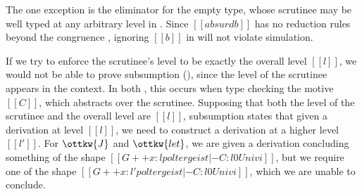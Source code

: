 \documentclass[acmsmall, screen=true, nonacm=true,
  review=\ifpublic false\else true\fi,
  anonymous=\ifanonymous true\else false\fi
]{acmart}
\makeatletter
\newcommand{\name}{\texorpdfstring{DCOI$^{\omega}$\@\xspace}{DCOI-omega}}
\newcommand{\mathcolorbox}[2]{\colorbox{#1}{$#2$}}
\newcommand{\hlcolor}{yellow}
\makeatother
\begin{document}
The one exception is the eliminator for the empty type,
whose scrutinee may be well typed at any arbitrary level in .
Since $[[absurd b]]$ has no reduction rules beyond the congruence ,
ignoring $[[b]]$ in  will not violate simulation.

If we try to enforce the scrutinee's level
to be exactly the overall level $[[l]]$,
we would not be able to prove subsumption (),
since the level of the scrutinee appears in the context.
In both , this occurs when type checking the motive $[[C]]$,
which abstracts over the scrutinee.
Supposing that both the level of the scrutinee and the overall level are $[[l]]$,
subsumption states that given a derivation at level $[[l]]$,
we need to construct a derivation at a higher level $[[l']]$.
For $\ottkw{J}$ and $\ottkw{let}$,
we are given a derivation concluding something of the shape
$[[G ++ x : l poltergeist |- C : l0 Univ i]]$,
but we require one of the shape
$[[G ++ x : l' poltergeist |- C : l0 Univ i]]$,
which we are unable to conclude.



\end{document}
